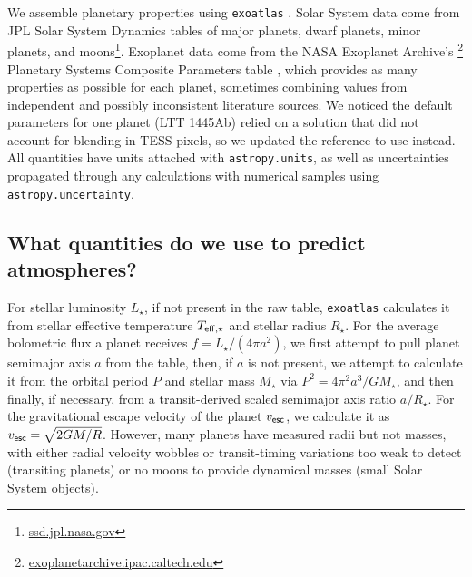 \documentclass[modern,linenumbers,trackchanges]{aastex7}
\begin{document}
We assemble planetary properties using \texttt{exoatlas} \citep{berta-thompsonZkbtExoatlas2025}. Solar System data come from JPL Solar System Dynamics tables of major planets, dwarf planets, minor planets, and moons\footnote{\href{https://ssd.jpl.nasa.gov}{ssd.jpl.nasa.gov}}. Exoplanet data come from the NASA Exoplanet Archive's \citep{christiansenNASAExoplanetArchive2025}\footnote{\href{https://exoplanetarchive.ipac.caltech.edu}{exoplanetarchive.ipac.caltech.edu}} Planetary Systems Composite Parameters table \citep{nasaexoplanetscienceinstitutePlanetarySystemsComposite2020, nasaexoplanetscienceinstitutePlanetarySystemsTable2020}, which provides as many properties as possible for each planet, sometimes combining values from independent and possibly inconsistent literature sources. We noticed the default parameters for one planet (LTT 1445Ab) relied on a solution that did not account for blending in TESS pixels, so we updated the reference to use  \citet{passHSTWFC3Light2023} instead. All quantities have units attached with \texttt{astropy.units}, as well as uncertainties propagated through any calculations with numerical samples using \texttt{astropy.uncertainty}. %


\subsection{What quantities do we use to predict atmospheres?}

For stellar luminosity $L_\star$, if not present in the raw table, \texttt{exoatlas} calculates it from stellar effective temperature $T_{\sf eff, \star}$ and stellar radius $R_\star$. For the average bolometric flux a planet receives $f = L_\star/(4\pi a^2)$, we first attempt to pull planet semimajor axis $a$ from the table, then, if $a$ is not present, we attempt to calculate it from the orbital period $P$ and stellar mass $M_\star$ via $P^2 = 4\pi^2 a^3/GM_\star$, and then finally, if necessary, from a transit-derived scaled semimajor axis ratio $a/R_\star$. For the gravitational escape velocity of the planet $v_{\sf esc}$, we calculate it as $v_{\sf esc} = \sqrt{2GM / R}$. However, many planets have measured radii but not masses, with either radial velocity wobbles or transit-timing variations too weak to detect (transiting planets) or no moons to provide dynamical masses (small Solar System objects). 
\end{document}
